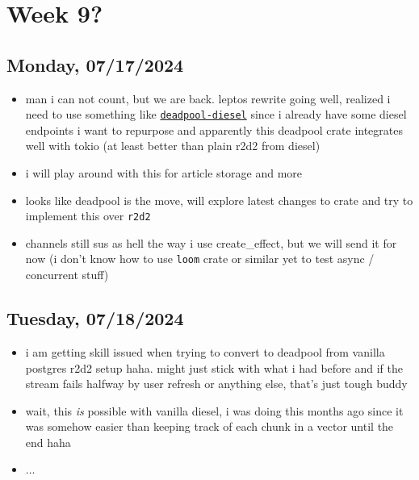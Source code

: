 \newpage
\section{Week 9?}
\subsection*{Monday, 07/17/2024}
\begin{itemize}
    \item man i can not count, but we are back. leptos rewrite going well,
        realized i need to use something like
        \texttt{\textcolor{blue}{\href{https://crates.io/crates/deadpool-diesel}{deadpool-diesel}}} since i
        already have some diesel endpoints i want to repurpose and apparently
        this deadpool crate integrates well with tokio (at least better than
        plain r2d2 from diesel)
    \item i will play around with this for article storage and more
    \item looks like deadpool is the move, will explore latest changes to crate
        and try to implement this over \texttt{r2d2}
    \item channels still sus as hell the way i use create_effect, but we will
        send it for now (i don't know how to use \texttt{loom} crate or similar yet to
        test async / concurrent stuff)
\end{itemize}

\subsection*{Tuesday, 07/18/2024}
\begin{itemize}
    \item i am getting skill issued when trying to convert to deadpool from
        vanilla postgres r2d2 setup haha. might just stick with what i had
        before and if the stream fails halfway by user refresh or anything else,
        that's just tough buddy\footnotemark
    \item wait, this \textit{is} possible with vanilla diesel, i was doing this 
        months ago since it was somehow easier than keeping track of each chunk 
        in a vector until the end haha
    \item ...
\end{itemize}

